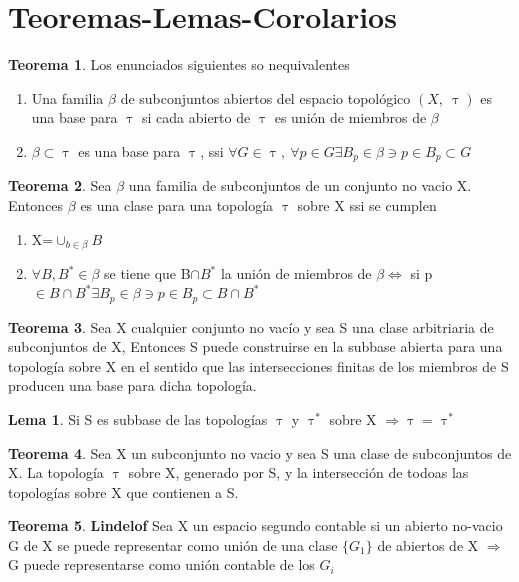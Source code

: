\documentclass{article}
\theoremstyle{definition}
\newtheorem{theorem}{Teorema}[section]
\newtheorem{lemma}{Lema}[section]
\begin{document}
\section{Teoremas-Lemas-Corolarios}
\begin{theorem}
	Los enunciados siguientes so nequivalentes
	\begin{enumerate}
		\item Una familia $\beta$ de subconjuntos abiertos del espacio topológico $(X,\ \uptau)$ es una base para $\uptau$ si cada abierto de $\uptau$ es unión de miembros de $\beta$
		\item $\beta\subset\uptau$ es una base para $\uptau$, ssi $\forall G\in \uptau,\ \forall p\in G \exists B_p\in\beta\ni p\in B_p\subset G$ 
	\end{enumerate}
\end{theorem}
\begin{theorem}
	 Sea $\beta$ una familia de subconjuntos de un conjunto no vacio X. Entonces $\beta$ es una clase para una topología $\uptau$ sobre X ssi se cumplen 
	 \begin{enumerate}
	 \item X=$\cup_{b\in\beta} B$
	 \item $\forall B, B^*\in\beta$ se tiene que B$\cap B^*$ la unión de miembros de $\beta \Leftrightarrow$ si p$\in B\cap B^*\exists B_p\in\beta\ni p\in B_p\subset B\cap B^*$ 
	 \end{enumerate}
\end{theorem}
\begin{theorem}
	Sea X cualquier conjunto no vacío y sea S una clase arbitriaria de subconjuntos de X, Entonces S puede construirse en la subbase abierta para una topología sobre X en el sentido que las intersecciones finitas de los miembros de S producen una base para dicha topología.
\end{theorem}
\begin{lemma}
Si S es subbase de las topologías $\uptau$ y $\uptau^*$  sobre X $\Rightarrow\uptau = \uptau^*$
\end{lemma}
\begin{theorem}
Sea X un subconjunto no vacio y sea S una clase de subconjuntos de X. La topología $\uptau$ sobre X, generado por S, y la intersección de todoas las topologías sobre X que contienen a S. 
\end{theorem}
\begin{theorem}{\textbf{Lindelof}}
	Sea X un espacio segundo contable si un abierto no-vacio G de X se puede representar como unión de una clase $\{G_1\}$ de abiertos de X $\Rightarrow$ G puede representarse como unión contable de los $G_i$
\end{theorem}
\end{document}
